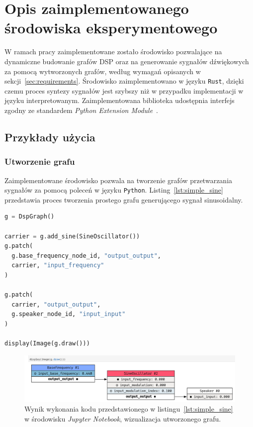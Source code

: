 \section{Opis zaimplementowanego środowiska eksperymentowego}

W ramach pracy zaimplementowane zostało środowisko pozwalające na dynamiczne budowanie grafów DSP oraz
na generowanie sygnałów dźwiękowych za pomocą wytworzonych grafów,
według wymagań opisanych w sekcji~\ref{sec:requirements}. Środowisko zaimplementowano w języku \texttt{Rust},
dzięki czemu proces syntezy sygnałów jest szybszy niż w przypadku implementacji w języku interpretowanym.
Zaimplementowana biblioteka udostępnia interfejs zgodny ze standardem
\textit{Python Extension Module}~\cite{python_extension_module}.

\subsection{Przykłady użycia}

\subsubsection{Utworzenie grafu}

Zaimplementowane środowisko pozwala na tworzenie grafów przetwarzania sygnałów za pomocą poleceń w języku \texttt{Python}.
Listing~\ref{lst:simple_sine} przedstawia proces tworzenia prostego grafu generującego sygnał sinusoidalny.

\begin{lstlisting}[language=python, caption=Utworzenie prostego grafu generującego sygnał sinusoidalny., label={lst:simple_sine}]
g = DspGraph()

carrier = g.add_sine(SineOscillator())
g.patch(
  g.base_frequency_node_id, "output_output",
  carrier, "input_frequency"
)

g.patch(
  carrier, "output_output",
  g.speaker_node_id, "input_input"
)

display(Image(g.draw()))
\end{lstlisting}

\begin{figure}[H]\label{fig:example_graph_creation_jupyter}
    \centering
    \includegraphics[width=1.0\linewidth]{rys05/simple_graph_creation_example.png}
    \caption{
      Wynik wykonania kodu przedstawionego w listingu~\ref{lst:simple_sine} w środowisku \textit{Jupyter Notebook},
      wizualizacja utworzonego grafu.
    }
\end{figure}

